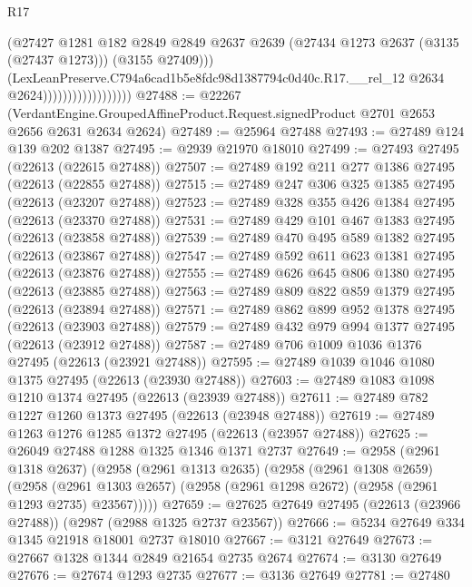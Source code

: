 \begin{lexlean}{R17}
\begin{coremodule}
                                        (@27427
                                          @1281
                                          @182
                                          @2849
                                          @2849
                                          @2637
                                          @2639
                                          (@27434 @1273 @2637 (@3135 (@27437 @1273)))
                                          (@3155 @27409)))
                                      (LexLeanPreserve.C794a6cad1b5e8fdc98d1387794c0d40c.R17.__rel_12
                                        @2634
                                        @2624))))))))))))))))))
@27488 := @22267
    (VerdantEngine.GroupedAffineProduct.Request.signedProduct @2701 @2653 @2656 @2631 @2634 @2624)
@27489 := @25964 @27488
@27493 := @27489 @124 @139 @202 @1387
@27495 := @2939 @21970 @18010
@27499 := @27493 @27495 (@22613 (@22615 @27488))
@27507 := @27489 @192 @211 @277 @1386 @27495 (@22613 (@22855 @27488))
@27515 := @27489 @247 @306 @325 @1385 @27495 (@22613 (@23207 @27488))
@27523 := @27489 @328 @355 @426 @1384 @27495 (@22613 (@23370 @27488))
@27531 := @27489 @429 @101 @467 @1383 @27495 (@22613 (@23858 @27488))
@27539 := @27489 @470 @495 @589 @1382 @27495 (@22613 (@23867 @27488))
@27547 := @27489 @592 @611 @623 @1381 @27495 (@22613 (@23876 @27488))
@27555 := @27489 @626 @645 @806 @1380 @27495 (@22613 (@23885 @27488))
@27563 := @27489 @809 @822 @859 @1379 @27495 (@22613 (@23894 @27488))
@27571 := @27489 @862 @899 @952 @1378 @27495 (@22613 (@23903 @27488))
@27579 := @27489 @432 @979 @994 @1377 @27495 (@22613 (@23912 @27488))
@27587 := @27489 @706 @1009 @1036 @1376 @27495 (@22613 (@23921 @27488))
@27595 := @27489 @1039 @1046 @1080 @1375 @27495 (@22613 (@23930 @27488))
@27603 := @27489 @1083 @1098 @1210 @1374 @27495 (@22613 (@23939 @27488))
@27611 := @27489 @782 @1227 @1260 @1373 @27495 (@22613 (@23948 @27488))
@27619 := @27489 @1263 @1276 @1285 @1372 @27495 (@22613 (@23957 @27488))
@27625 := @26049 @27488 @1288 @1325 @1346 @1371 @2737
@27649 := @2958
    (@2961 @1318 @2637)
    (@2958
      (@2961 @1313 @2635)
      (@2958
        (@2961 @1308 @2659)
        (@2958 (@2961 @1303 @2657) (@2958 (@2961 @1298 @2672) (@2958 (@2961 @1293 @2735) @23567)))))
@27659 := @27625 @27649 @27495 (@22613 (@23966 @27488)) (@2987 (@2988 @1325 @2737 @23567))
@27666 := @5234 @27649 @334 @1345 @21918 @18001 @2737 @18010
@27667 := @3121 @27649
@27673 := @27667 @1328 @1344 @2849 @21654 @2735 @2674
@27674 := @3130 @27649
@27676 := @27674 @1293 @2735
@27677 := @3136 @27649
@27781 := @27480

\end{coremodule}
\end{lexlean}
